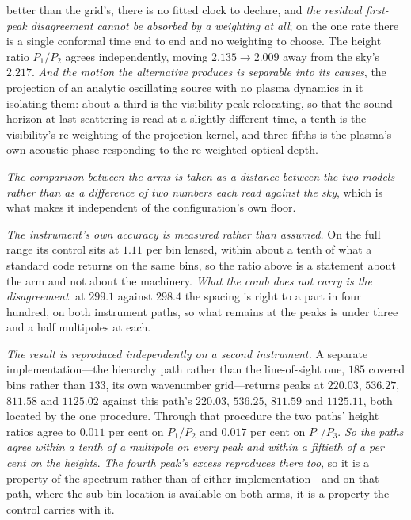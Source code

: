 \documentclass[11pt,a4paper]{article}
\theoremstyle{plain}
\theoremstyle{definition}
\theoremstyle{remark}
\begin{document}
better than the grid's, there is no fitted clock to declare, and \emph{the residual first-peak
disagreement cannot be absorbed by a weighting at all}; on the one rate there is a single conformal time end
to end and no weighting to choose. The height ratio $P_1/P_2$ agrees independently, moving $2.135\to2.009$ away from the
sky's $2.217$. \emph{And the motion the alternative produces is separable into its causes}, the
projection of an analytic oscillating source with no plasma dynamics in it isolating them: about a third
is the visibility peak relocating, so that the sound horizon at last scattering is read at a slightly
different time, a tenth is the visibility's re-weighting of the projection kernel, and three fifths is
the plasma's own acoustic phase responding to the re-weighted optical
depth.

\emph{The comparison between the arms is taken as a distance between
the two models rather than as a difference of two numbers each read against the sky}, which is what makes it
independent of the configuration's own floor.

\emph{The instrument's own accuracy is measured rather than assumed.} On the full range its control sits at
$1.11$ per bin lensed, within about a tenth of what a standard code returns on the same bins, so the ratio
above is a statement about the arm and not about the machinery. \emph{What the comb does not carry is the
disagreement}: at $299.1$ against $298.4$ the spacing is right to a part in four hundred, on both instrument
paths, so what remains at the peaks is under three and a half multipoles at each.

\emph{The result is reproduced independently on a second instrument.} A separate implementation---the
hierarchy path rather than the line-of-sight one, $185$ covered bins rather than $133$, its own wavenumber
grid---returns peaks at $220.03$, $536.27$, $811.58$ and $1125.02$ against this path's $220.03$, $536.25$, $811.59$ and
$1125.11$, both located by the one procedure. Through that procedure the two paths' height ratios agree to
$0.011$ per cent on $P_1/P_2$ and $0.017$ per cent on
$P_1/P_3$.
\emph{So the paths agree within a tenth of a multipole on every peak and within a fiftieth of a per cent on the
heights}. \emph{The fourth peak's excess reproduces there too}, so it is a property of the
spectrum rather than of either implementation---and on that path, where the sub-bin location is available on
both arms, it is a property the control carries with
it.
\end{document}
